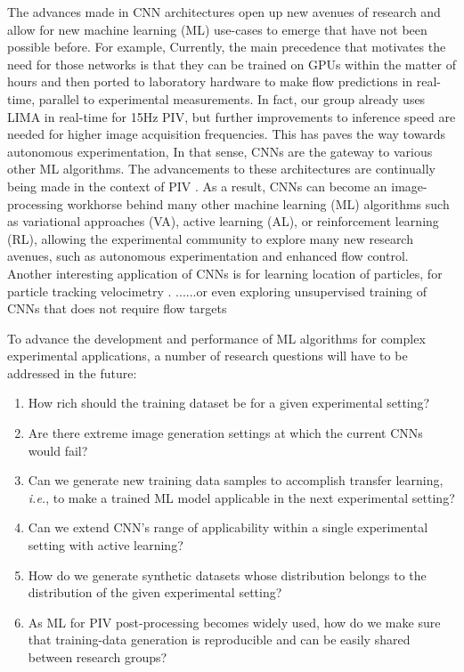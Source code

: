 \documentclass[a4paper,fleqn]{cas-dc}
\begin{document}
The advances made in CNN architectures open up new avenues of research and allow for new machine learning (ML) use-cases to emerge that have not been possible before. For example, 
Currently, the main precedence that motivates the need for those networks is that they can be trained on GPUs within the matter of hours and then ported to laboratory hardware to make flow predictions in real-time, parallel to experimental measurements. In fact, our group already uses LIMA in real-time for 15Hz PIV, but further improvements to inference speed are needed for higher image acquisition frequencies.
This has paves the way towards autonomous experimentation, 
In that sense, CNNs are the gateway to various other ML algorithms.
The advancements to these architectures are continually being made in the context of PIV \citep{shan2024lightweight, elrefaie2024site}. As a result, CNNs can become an image-processing workhorse behind many other machine learning (ML) algorithms such as variational approaches (VA), active learning (AL), or reinforcement learning (RL), allowing the experimental community to explore many new research avenues, such as autonomous experimentation and enhanced flow control. Another interesting application of CNNs is for learning location of particles, for particle tracking velocimetry \cite{godbersen2024peak}.
......or even exploring unsupervised training of CNNs that does not require flow targets \cite{lagemann2024challenges}

To advance the development and performance of ML algorithms for complex experimental applications, a number of research questions will have to be addressed in the future:
\begin{enumerate}
\item How rich should the training dataset be for a given experimental setting?
\item Are there extreme image generation settings at which the current CNNs would fail?
\item Can we generate new training data samples to accomplish transfer learning, \textit{i.e.}, to make a trained ML model applicable in the next experimental setting?
\item Can we extend CNN's range of applicability within a single experimental setting with active learning?
\item How do we generate synthetic datasets whose distribution belongs to the distribution of the given experimental setting?
\item As ML for PIV post-processing becomes widely used, how do we make sure that training-data generation is reproducible and can be easily shared between research groups?
\end{enumerate}
\end{document}
